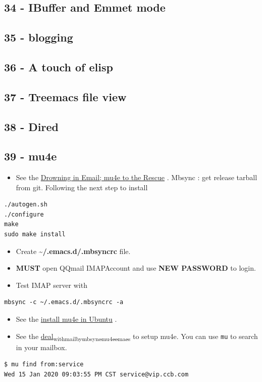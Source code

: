 \documentclass[11pt]{article}
\begin{document}
\subsection{34 - IBuffer and Emmet mode}
\label{sec:orgd84118a}
\subsection{35 - blogging}
\label{sec:org251050e}
\subsection{36 - A touch of elisp}
\label{sec:org417ec36}
\subsection{37 - Treemacs file view}
\label{sec:org959eeac}
\subsection{38 - Dired}
\label{sec:org8ee523f}
\subsection{39 - mu4e}
\label{sec:orga888226}
\begin{itemize}
\item See the \href{https://www.macs.hw.ac.uk/\~rs46/posts/2014-01-13-mu4e-email-client.html}{Drowning in Email; mu4e to the Rescue} . Mbsync : get release
tarball from git. Following the next step to install
\end{itemize}
\begin{verbatim}
./autogen.sh
./configure
make
sudo make install
\end{verbatim}

\begin{itemize}
\item Create \textbf{\textasciitilde{}/.emacs.d/.mbsyncrc} file.
\item \textbf{MUST} open QQmail IMAPAccount and use \textbf{NEW PASSWORD} to login.
\item Test IMAP server with
\end{itemize}
\begin{verbatim}
mbsync -c ~/.emacs.d/.mbsyncrc -a
\end{verbatim}

\begin{itemize}
\item See the \href{https://www.djcbsoftware.nl/code/mu/mu4e/Installation.html}{install mu4e in Ubuntu} .
\item See the \href{https://pengpengxp.github.io/archive/before-2018-11-10/2018-10-14-deal\_with\_mail\_by\_mbsync\_mu4e\_emacs.html\#orgf228b24}{deal\textsubscript{with}\textsubscript{mail}\textsubscript{by}\textsubscript{mbsync}\textsubscript{mu4e}\textsubscript{emacs}} to setup mu4e. You can use \texttt{mu}
to search in your mailbox.
\end{itemize}
\begin{verbatim}
$ mu find from:service
Wed 15 Jan 2020 09:03:55 PM CST service@vip.ccb.com 
\end{verbatim}
\end{document}
